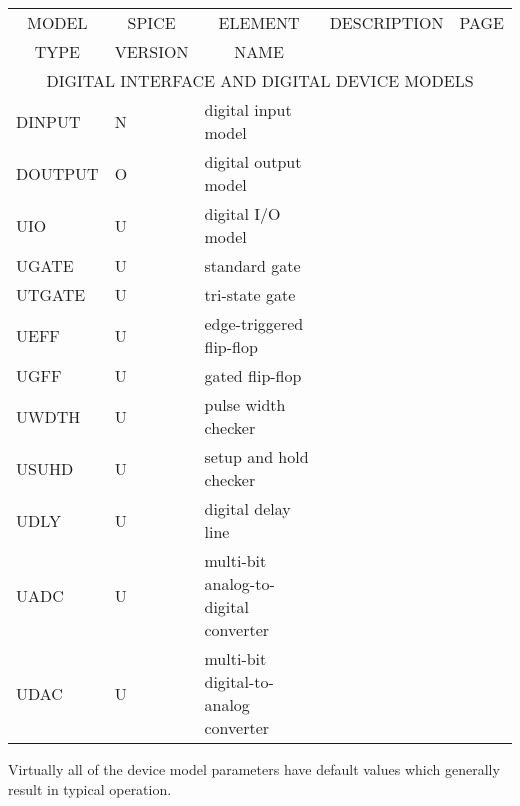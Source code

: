 \begin{center}
\begin{tabular}{|l|l|l|l|l|}
\hline
\multicolumn{1}{|c}{MODEL}&
\multicolumn{1}{|c}{SPICE}&
\multicolumn{1}{|c}{ELEMENT}&
\multicolumn{1}{|c}{DESCRIPTION}&
\multicolumn{1}{|c|}{PAGE}\\
\multicolumn{1}{|c}{TYPE}&
\multicolumn{1}{|c}{VERSION}& \multicolumn{1}{|c}{NAME}&&\\
\hline
\hline
\multicolumn{5}{|c|}{DIGITAL INTERFACE AND DIGITAL DEVICE MODELS}
\\
\hline
DINPUT  \modelversion{\pspice} &N& digital input model
    & \pageref{DINPUTmodel} \\
DOUTPUT \modelversion{\pspice} &O& digital output model
    & \pageref{DOUTPUTmodel} \\
UIO    \modelversion{\pspice} &U& digital I/O model
    & \\ %
UGATE   \modelversion{\pspice} &U& standard gate
    & \\ %
UTGATE  \modelversion{\pspice} &U& tri-state gate
    & \\ %
UEFF    \modelversion{\pspice} &U& edge-triggered flip-flop
    & \\ %
UGFF    \modelversion{\pspice} &U& gated flip-flop
    & \\ %
UWDTH   \modelversion{\pspice} &U& pulse width checker
    & \\ %
USUHD   \modelversion{\pspice} &U& setup and hold checker
    & \\ %
UDLY    \modelversion{\pspice} &U& digital delay line
    & \\ %
UADC    \modelversion{\pspice} &U& multi-bit analog-to-digital converter
    & \\ %
UDAC    \modelversion{\pspice} &U& multi-bit digital-to-analog converter
        &\\ %
\hline
\end{tabular}
\end{center}
Virtually all of the device model parameters have default values which
generally result in typical operation.\\[0.1in]

